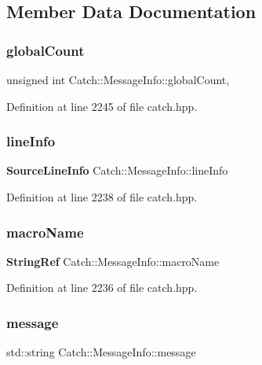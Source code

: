 \subsection{Member Data Documentation}
\mbox{\label{struct_catch_1_1_message_info_a250459555d236f9510a5afd78a6c1979}} 
\subsubsection{globalCount}
{\footnotesize\ttfamily unsigned int Catch\+::\+Message\+Info\+::global\+Count\hspace{0.3cm}{\ttfamily [static]}, {\ttfamily [private]}}



Definition at line 2245 of file catch.\+hpp.

\mbox{\label{struct_catch_1_1_message_info_a985165328723e599696ebd8e43195cc5}} 
\subsubsection{lineInfo}
{\footnotesize\ttfamily \textbf{ Source\+Line\+Info} Catch\+::\+Message\+Info\+::line\+Info}



Definition at line 2238 of file catch.\+hpp.

\mbox{\label{struct_catch_1_1_message_info_a3ee7cd41def0989d2193bad7101436a0}} 
\subsubsection{macroName}
{\footnotesize\ttfamily \textbf{ String\+Ref} Catch\+::\+Message\+Info\+::macro\+Name}



Definition at line 2236 of file catch.\+hpp.

\mbox{\label{struct_catch_1_1_message_info_ab6cd06e050bf426c6577502a5c50e256}} 
\subsubsection{message}
{\footnotesize\ttfamily std\+::string Catch\+::\+Message\+Info\+::message}



